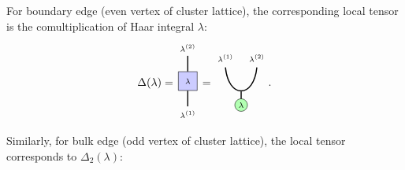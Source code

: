 \documentclass[a4paper,11pt]{article}
\theoremstyle{theorem}
\theoremstyle{remark}
\newcommand{\cone}{(1)}
\newcommand{\ctwo}{(2)}
\begin{document}
For boundary edge (even vertex of cluster lattice), the corresponding local tensor is the comultiplication of Haar integral $\lambda$:
\begin{equation}
     \Delta(\lambda)= \begin{aligned}			
\begin{tikzpicture}
    \node[draw, fill=blue!20, minimum width=0.6cm, minimum height=0.6cm] (center) at (0,0) {$\scriptstyle\lambda$};
    \draw[line width=1.0pt] (center.north) -- ++(0,.5) node[above] {$\scriptstyle\lambda^{\ctwo}$};
    \draw[line width=1.0pt ] (center.south) -- ++(0,-.5) node[below] {$\scriptstyle \lambda^{\cone}$};
\end{tikzpicture}
\end{aligned} =  \begin{aligned}
				\begin{tikzpicture}
					\draw[black, line width=1.0pt]  (-0.5, 1) .. controls (-0.4, 0) and (0.4, 0) .. (0.5, 1);
					\draw[black, line width=1.0pt]  (0,0.23)--(0,-0.23);
         \filldraw[green!30, draw=black] 
       (0,-0.2) circle (0.2);
    \node at (0, -0.2) {\textcolor{black}{$\scriptstyle \lambda$}};
                   \node at (-0.5, 1.3) {$\scriptstyle \lambda^{\cone}$};
	                   \node at (0.5, 1.3) {$\scriptstyle \lambda^{\ctwo}$};			
    \end{tikzpicture}
\end{aligned}.
\end{equation}
Similarly, for bulk edge (odd vertex of cluster lattice), the local tensor corresponds to $\Delta_2(\lambda)$:
\end{document}
